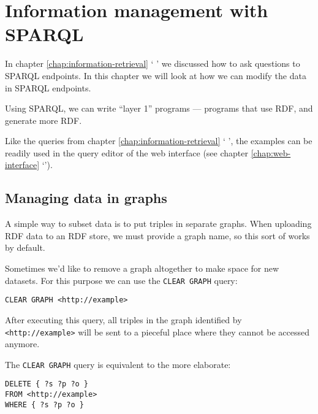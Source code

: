 \chapter{Information management with SPARQL}

  In chapter \ref{chap:information-retrieval} {\color{LinkGray}`%
  '} we discussed how to ask questions
  to SPARQL endpoints.  In this chapter we will look at how we can modify
  the data in SPARQL endpoints.

  Using SPARQL, we can write ``layer 1'' programs --- programs that use RDF,
  and generate more RDF.

  Like the queries from chapter \ref{chap:information-retrieval} {\color{LinkGray}`%
  '}, the examples can be readily used in
  the query editor of the web interface (see chapter \ref{chap:web-interface}
  {\color{LinkGray}`'}).

\section{Managing data in graphs}

  A simple way to subset data is to put triples in separate graphs.  When
  uploading RDF data to an RDF store, we must provide a graph name, so this
  sort of works by default.

  Sometimes we'd like to remove a graph altogether to make space for new
  datasets.  For this purpose we can use the \texttt{CLEAR GRAPH} query:

\begin{siderules}
\begin{verbatim}
CLEAR GRAPH <http://example>
\end{verbatim}
\end{siderules}

  After executing this query, all triples in the graph identified by
  \texttt{<http://example>} will be sent to a pieceful place where they
  cannot be accessed anymore.

  The \texttt{CLEAR GRAPH} query is equivalent to the more elaborate:

\begin{siderules}
\begin{verbatim}
DELETE { ?s ?p ?o }
FROM <http://example>
WHERE { ?s ?p ?o }
\end{verbatim}
\end{siderules}

